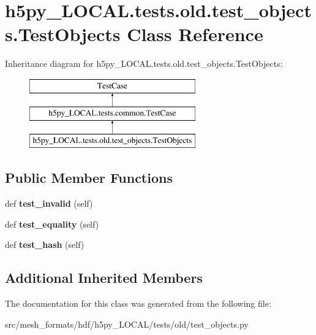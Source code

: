 \hypertarget{classh5py__LOCAL_1_1tests_1_1old_1_1test__objects_1_1TestObjects}{}\section{h5py\+\_\+\+L\+O\+C\+A\+L.\+tests.\+old.\+test\+\_\+objects.\+Test\+Objects Class Reference}
\label{classh5py__LOCAL_1_1tests_1_1old_1_1test__objects_1_1TestObjects}
Inheritance diagram for h5py\+\_\+\+L\+O\+C\+A\+L.\+tests.\+old.\+test\+\_\+objects.\+Test\+Objects\+:\begin{figure}[H]
\begin{center}
\leavevmode
\includegraphics[height=3.000000cm]{classh5py__LOCAL_1_1tests_1_1old_1_1test__objects_1_1TestObjects}
\end{center}
\end{figure}
\subsection*{Public Member Functions}
\begin{DoxyCompactItemize}
\item 
\mbox{\label{classh5py__LOCAL_1_1tests_1_1old_1_1test__objects_1_1TestObjects_a36dfa24cb9a7207c313c083550b7db6a}} 
def {\bfseries test\+\_\+invalid} (self)
\item 
\mbox{\label{classh5py__LOCAL_1_1tests_1_1old_1_1test__objects_1_1TestObjects_af989a307ee3250b9afef53c18198eeb3}} 
def {\bfseries test\+\_\+equality} (self)
\item 
\mbox{\label{classh5py__LOCAL_1_1tests_1_1old_1_1test__objects_1_1TestObjects_afa0fc7f95ae31d63f2aa9520263defaf}} 
def {\bfseries test\+\_\+hash} (self)
\end{DoxyCompactItemize}
\subsection*{Additional Inherited Members}


The documentation for this class was generated from the following file\+:\begin{DoxyCompactItemize}
\item 
src/mesh\+\_\+formats/hdf/h5py\+\_\+\+L\+O\+C\+A\+L/tests/old/test\+\_\+objects.\+py\end{DoxyCompactItemize}
